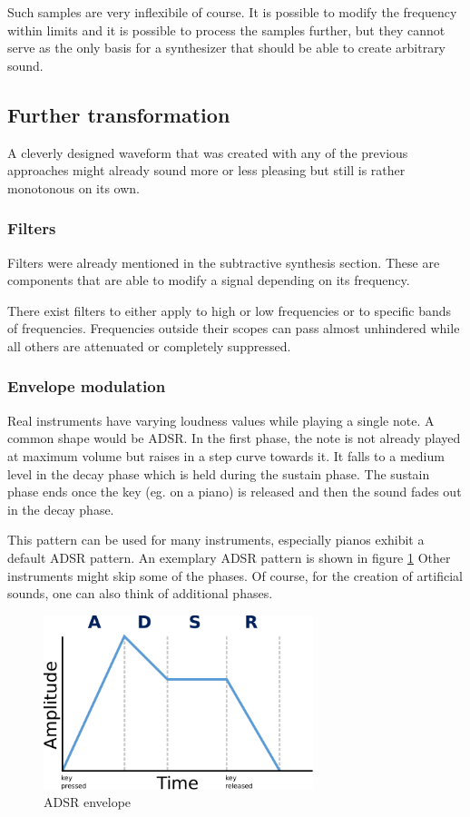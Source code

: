 				Such samples are very inflexibile of course.
				It is possible to modify the frequency within limits and it is possible to	process the samples further, but they cannot serve as the only basis for a synthesizer that should be able to create arbitrary sound.			
		\subsection{Further transformation}

			A cleverly designed waveform that was created with any of the previous approaches might already sound more or less pleasing but still is rather monotonous on its own.
			
			\subsubsection{Filters} 
				\label{subsec:filters}
				Filters were already mentioned in the subtractive synthesis section. 
				These are components that are able to modify a signal depending on its frequency.
				
				There exist filters to either apply to high or low frequencies or to specific bands of frequencies.
				Frequencies outside their scopes can pass almost unhindered while all others are attenuated or completely suppressed.
			\subsubsection{Envelope modulation}
				Real instruments have varying loudness values while playing a single note.
				A common shape would be	\ac{ADSR}.
				In the first phase, the note is not already played at maximum volume but raises in a step curve towards it.
				It falls to a medium level in the decay phase which is held during the sustain phase.
				The sustain phase ends once the key (eg. on a piano) is released and then the sound fades out in the decay phase.
				
				This pattern can be used for many instruments, especially pianos exhibit a default \ac{ADSR} pattern. An exemplary \ac{ADSR} pattern is shown in figure \ref{fig:adsr}
				Other instruments might skip some of the phases. 
				Of course, for the creation of artificial sounds, one can also think of additional phases.
				
				\begin{figure}[!h]
				\centering
					\includegraphics[width=0.70\textwidth]{images/adsr.pdf}
				\caption{\ac{ADSR} envelope}
				\label{fig:adsr}
				\end{figure}
				
